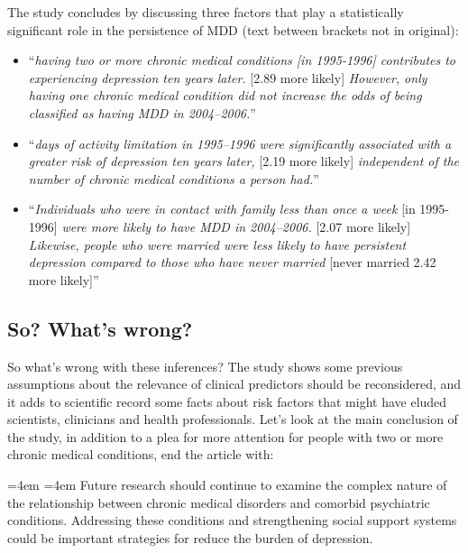 \documentclass[12pt,]{book}
\providecommand{\tightlist}{%
  \setlength{\itemsep}{0pt}\setlength{\parskip}{0pt}}
\renewenvironment{quote}{%
  \par \small \medskip \block
  \leftskip=4em \rightskip=4em%
  \noindent \ignorespaces}{%
  \par \medskip
  }
\begin{document}
The study concludes by discussing three factors that play a statistically significant role in the persistence of MDD (text between brackets not in original):

\begin{itemize}
\tightlist
\item
  ``\emph{having two or more chronic medical conditions {[}in 1995-1996{]} contributes to experiencing depression ten years later.} {[}2.89 more likely{]} \emph{However, only having one chronic medical condition did not increase the odds of being classified as having MDD in 2004--2006.}''
\item
  ``\emph{days of activity limitation in 1995--1996 were significantly associated with a greater risk of depression ten years later,} {[}2.19 more likely{]} \emph{independent of the number of chronic medical conditions a person had.}''
\item
  ``\emph{Individuals who were in contact with family less than once a week} {[}in 1995-1996{]} \emph{were more likely to have MDD in 2004--2006.} {[}2.07 more likely{]} \emph{Likewise, people who were married were less likely to have persistent depression compared to those who have never married} {[}never married 2.42 more likely{]}''
\end{itemize}

\hypertarget{so-whats-wrong}{%
\subsection*{So? What's wrong?}\label{so-whats-wrong}}

So what's wrong with these inferences? The study shows some previous assumptions about the relevance of clinical predictors should be reconsidered, and it adds to scientific record some facts about risk factors that might have eluded scientists, clinicians and health professionals. Let's look at the main conclusion of the study, in addition to a plea for more attention for people with two or more chronic medical conditions, \citet{walker2015a} end the article with:

\begin{quote}
Future research should continue to examine the complex nature of the relationship between chronic medical disorders and comorbid psychiatric conditions. Addressing these conditions and strengthening social support systems could be important strategies for reduce the burden of depression.
\end{quote}
\end{document}
